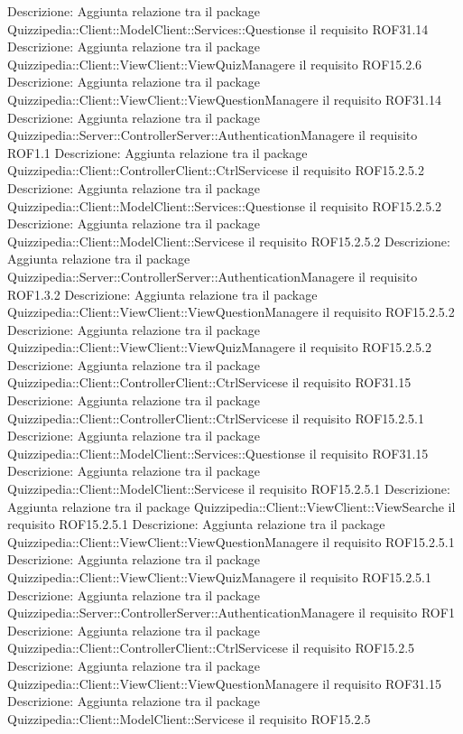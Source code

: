 Descrizione: Aggiunta relazione tra il package Quizzipedia::Client::ModelClient::Services::Questionse il requisito ROF31.14 
Descrizione: Aggiunta relazione tra il package Quizzipedia::Client::ViewClient::ViewQuizManagere il requisito ROF15.2.6 
Descrizione: Aggiunta relazione tra il package Quizzipedia::Client::ViewClient::ViewQuestionManagere il requisito ROF31.14 
Descrizione: Aggiunta relazione tra il package Quizzipedia::Server::ControllerServer::AuthenticationManagere il requisito ROF1.1 
Descrizione: Aggiunta relazione tra il package Quizzipedia::Client::ControllerClient::CtrlServicese il requisito ROF15.2.5.2 
Descrizione: Aggiunta relazione tra il package Quizzipedia::Client::ModelClient::Services::Questionse il requisito ROF15.2.5.2 
Descrizione: Aggiunta relazione tra il package Quizzipedia::Client::ModelClient::Servicese il requisito ROF15.2.5.2 
Descrizione: Aggiunta relazione tra il package Quizzipedia::Server::ControllerServer::AuthenticationManagere il requisito ROF1.3.2 
Descrizione: Aggiunta relazione tra il package Quizzipedia::Client::ViewClient::ViewQuestionManagere il requisito ROF15.2.5.2 
Descrizione: Aggiunta relazione tra il package Quizzipedia::Client::ViewClient::ViewQuizManagere il requisito ROF15.2.5.2 
Descrizione: Aggiunta relazione tra il package Quizzipedia::Client::ControllerClient::CtrlServicese il requisito ROF31.15 
Descrizione: Aggiunta relazione tra il package Quizzipedia::Client::ControllerClient::CtrlServicese il requisito ROF15.2.5.1 
Descrizione: Aggiunta relazione tra il package Quizzipedia::Client::ModelClient::Services::Questionse il requisito ROF31.15 
Descrizione: Aggiunta relazione tra il package Quizzipedia::Client::ModelClient::Servicese il requisito ROF15.2.5.1 
Descrizione: Aggiunta relazione tra il package Quizzipedia::Client::ViewClient::ViewSearche il requisito ROF15.2.5.1 
Descrizione: Aggiunta relazione tra il package Quizzipedia::Client::ViewClient::ViewQuestionManagere il requisito ROF15.2.5.1 
Descrizione: Aggiunta relazione tra il package Quizzipedia::Client::ViewClient::ViewQuizManagere il requisito ROF15.2.5.1 
Descrizione: Aggiunta relazione tra il package Quizzipedia::Server::ControllerServer::AuthenticationManagere il requisito ROF1 
Descrizione: Aggiunta relazione tra il package Quizzipedia::Client::ControllerClient::CtrlServicese il requisito ROF15.2.5 
Descrizione: Aggiunta relazione tra il package Quizzipedia::Client::ViewClient::ViewQuestionManagere il requisito ROF31.15 
Descrizione: Aggiunta relazione tra il package Quizzipedia::Client::ModelClient::Servicese il requisito ROF15.2.5 

